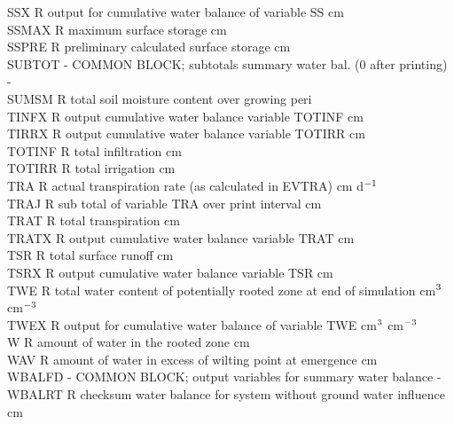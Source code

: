 \documentclass[11pt]{article}
\begin{document}
\begin{tabbing}
SSX\> \> R\> output for cumulative water balance of variable SS\> \> \> \> \> \> \> cm\\
SSMAX\> \> R\> maximum surface storage\> \> \> \> \> \> \> cm\\
SSPRE\> \> R \> preliminary calculated surface storage\> \> \> \> \> \> \> cm\\
SUBTOT\> \> -\> COMMON BLOCK; subtotals summary water bal. (0 after printing)\> \> \> \> \> \> \> -\\
SUMSM\> \> R\> total soil moisture content over growing peri \\
TINFX\> \> R\> output cumulative water balance variable TOTINF\> \> \> \> \> \> \> cm\\
TIRRX\> \> R\> output cumulative water balance variable TOTIRR\> \> \> \> \> \> \> cm\\
TOTINF\> \> R\> total infiltration\> \> \> \> \> \> \> cm\\
TOTIRR\> \> R\> total irrigation\> \> \> \> \> \> \> cm\\
TRA\> \> R\> actual transpiration rate (as calculated in EVTRA)\> \> \> \> \> \> \> cm d$^{{\rm -1}}$\\
TRAJ\> \> R\> sub total of variable TRA over print interval\> \> \> \> \> \> \> cm\\
TRAT\> \> R\> total transpiration\> \> \> \> \> \> \> cm\\
TRATX\> \> R\> output cumulative water balance variable TRAT\> \> \> \> \> \> \> cm\\
TSR\> \> R\> total surface runoff\> \> \> \> \> \> \> cm\\
TSRX\> \> R\> output cumulative water balance variable TSR\> \> \> \> \> \> \> cm\\
TWE\> \> R\> total water content of potentially rooted zone at end of simulation\> \> \> \> \> \> \> cm$^{{\rm 3}}$ cm$^{{\rm -3}}$\\
TWEX\> \> R\> output for cumulative water balance of variable TWE\> \> \> \> \> \> \> cm$^{{\rm 3}}$ cm$^{{\rm -3}}$\\
W\> \> R\> amount of water in the rooted zone\> \> \> \> \> \> \> cm\\
WAV\> \> R\> amount of water in excess of wilting point at emergence \> \> \> \> \> \> \> cm\\
WBALFD\> \> -\> COMMON BLOCK; output variables for summary water balance\> \> \> \> \> \> \> -\\
WBALRT\> \> R\> checksum water balance for system without ground water influence\> \> \> \> \> \> \> cm\\

\end{tabbing}
\end{document}
